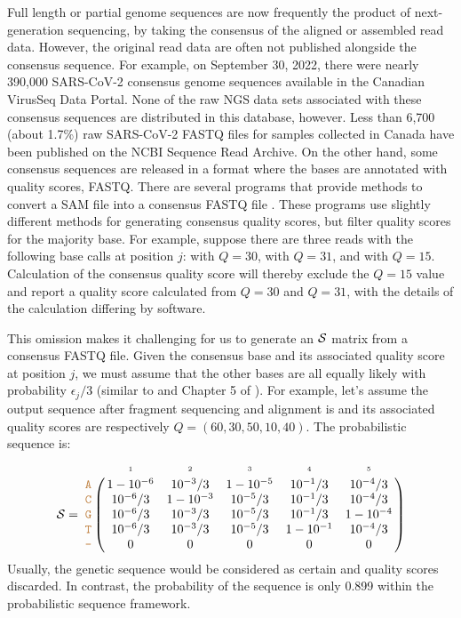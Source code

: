 \documentclass[12pt]{article}
\begin{document}
Full length or partial genome sequences are now frequently the product of next-generation sequencing, by taking the consensus of the aligned or assembled read data.
However, the original read data are often not published alongside the consensus sequence.
For example, on September 30, 2022, there were nearly 390,000 SARS-CoV-2 consensus genome sequences available in the Canadian VirusSeq Data Portal.
None of the raw NGS data sets associated with these consensus sequences are distributed in this database, however.
Less than 6,700 (about 1.7\%) raw SARS-CoV-2 FASTQ files for samples collected in Canada have been published on the NCBI Sequence Read Archive.
On the other hand, some consensus sequences are released in a format where the bases are annotated with quality scores, \eg FASTQ.
There are several programs that provide methods to convert a SAM file into a consensus FASTQ file \citep{liAdjustQualityScores2004, keithSimulatedAnnealingAlgorithm2002, liMappingShortDNA2008a}.
These programs use slightly different methods for generating consensus quality scores, but filter quality scores for the majority base.
For example, suppose there are three reads with the following base calls at position $j$:  with $Q=30$,  with $Q=31$, and  with $Q=15$.
Calculation of the consensus quality score will thereby exclude the $Q=15$ value and report a quality score calculated from $Q=30$ and $Q=31$, with the details of the calculation differing by software.


This omission makes it challenging for us to generate an $\mathcal{S}$ matrix from a consensus FASTQ file.
Given the consensus base and its associated quality score at position $j$, we must assume that the other bases are all equally likely with probability $\epsilon_j/3$ (similar to \cite{kuoEAGLEExplicitAlternative2018} and Chapter 5 of \cite{kozlov}).
For example, let's assume the output sequence after fragment sequencing and alignment is  and its associated quality scores are respectively $Q=(60,30,50,10,40)$.
The probabilistic sequence is:
\begin{equation}
\nps = 
\bordermatrix{
&\scriptscriptstyle{1} & \scriptscriptstyle{2}& \scriptscriptstyle{3}& \scriptscriptstyle{4} & \scriptscriptstyle{5} \cr
\sq{A} & 1-10^{-6} & 10^{-3}/3  & 1-10^{-5} & 10^{-1}/3 & 10^{-4}/3  \cr
\sq{C} & 10^{-6}/3 & 1-10^{-3}  & 10^{-5}/3 & 10^{-1}/3 & 10^{-4}/3  \cr
\sq{G} & 10^{-6}/3 & 10^{-3}/3  & 10^{-5}/3 & 10^{-1}/3 & 1-10^{-4} \cr
\sq{T} & 10^{-6}/3 & 10^{-3}/3  & 10^{-5}/3 & 1-10^{-1} & 10^{-4}/3 \cr
\sq{-} & 0 & 0 & 0 & 0 & 0 \cr
}
\end{equation}
Usually, the genetic sequence  would be considered as certain and quality scores discarded.
In contrast, the probability of the sequence  is only 0.899 within the probabilistic sequence framework.
\end{document}
